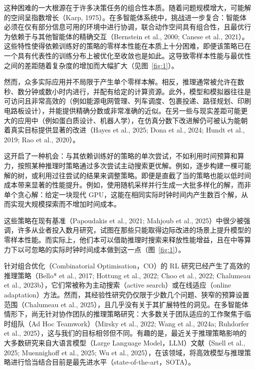 \documentclass[11pt,UTF8,fontset=fandol]{ctexart}
\begin{document}
这种困难的一大根源在于许多决策任务的组合性本质。随着问题规模增大，可能解的空间呈指数增长（Karp, 1975）。在多智能体系统中，挑战进一步复合：智能体必须在仅有部分信息可用的环境中进行协调，联合动作空间具有组合性，且最优行为依赖于与其他智能体的精确交互（Bernstein et al., 2000; Canese et al., 2021）。这些特性使得依赖训练好的策略的零样本性能在本质上十分困难，即便该策略已在一个具有代表性的训练分布上被优化至收敛也是如此。这导致零样本性能与最优性之间的差距随着复杂度的增加而大幅扩大（见图~\ref{fig:1}）。

然而，众多实际应用并不局限于产生单个零样本解。相反，推理通常被允许在数秒、数分钟或数小时内进行，并配有给定的计算资源。此外，模型和模拟器往往是可访问且非常高效的（例如能源电网管理、列车调度、包裹投递、路径规划、印刷电路板设计），并能提供精确分数或非常准确的近似。在另一些与现实差距可能更大的应用中（例如蛋白质设计、机器人学），在仿真分数下改进解仍可被认为能朝着真实目标提供显著的改进（Hayes et al., 2025; Dona et al., 2024; Hundt et al., 2019; Rao et al., 2020）。

这开启了一种机会：与其依赖训练好的策略的单次尝试，不如利用时间预算和算力，按照某种推理时策略通过多次尝试主动搜索更优解。例如，逐步构建一棵可能解的树，或利用过往尝试的结果来调整策略。即便是直截了当的策略也能以低时间成本带来显著的性能提升。例如，使用随机采样并行生成一大批多样化的解，而非单个贪心解：给定一块现代 GPU，这能在相同实际时钟时间内产生数百个解，从而实现大规模探索而不增加时间成本。

这些策略在现有基准（Papoudakis et al., 2021; Mahjoub et al., 2025）中很少被强调，许多从业者投入数月研究，试图在那些只能取得边际改进的场景上提升模型的零样本性能。而实际上，他们本可以借助推理时搜索来释放性能增益，且在中等算力下以可忽略的实际时钟时间成本做到这一点（图~\ref{fig:1}）。

针对组合优化（Combinatorial Optimisation，CO）的 RL 研究已经产生了高效的推理策略（Bello* et al., 2017; Hottung et al., 2022; Choo et al., 2022; Chalumeau et al., 2023b），它们常被称为主动搜索（active search）或在线适应（online adaptation）方法。然而，其经验性研究仍仅限于少数几个问题、狭窄的预算设置范围（Chalumeau et al., 2025），且几乎没有关于其扩展特性的洞见。在多智能体情形下，尚无针对协作团队的推理策略研究：大多数关于团队适应的工作聚焦于临时组队（Ad Hoc Teamwork）（Mirsky et al., 2022; Wang et al., 2024a; Ruhdorfer et al., 2025），这与我们的目标相邻但不同。有趣的是，最近关于推理策略影响的大多数研究来自大语言模型（Large Language Model，LLM）文献（Snell et al., 2025; Muennighoff et al., 2025; Wu et al., 2025），在该领域，将高效模型与推理策略进行恰当结合目前是最先进水平（state-of-the-art，SOTA）。
\end{document}
